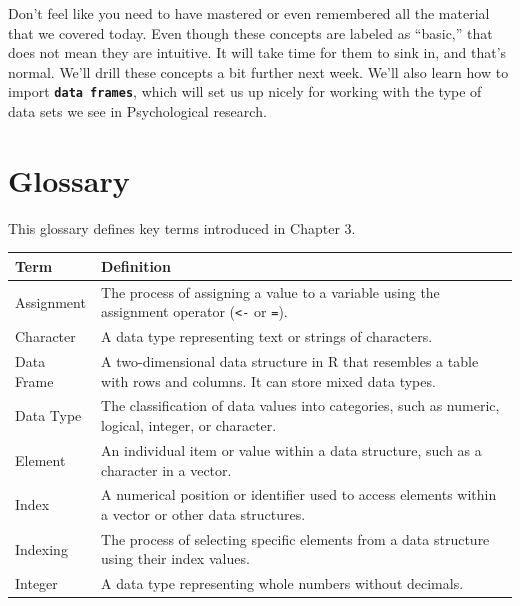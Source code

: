 \documentclass[
]{book}
\begin{document}
Don't feel like you need to have mastered or even remembered all the material that we covered today. Even though these concepts are labeled as ``basic,'' that does not mean they are intuitive. It will take time for them to sink in, and that's normal. We'll drill these concepts a bit further next week. We'll also learn how to import \textbf{\texttt{data\ frames}}, which will set us up nicely for working with the type of data sets we see in Psychological research.

\section{Glossary}\label{glossary-1}

This glossary defines key terms introduced in Chapter 3.

\begin{longtable}[]{@{}
  >{\raggedright\arraybackslash}p{}
  >{\raggedright\arraybackslash}p{}@{}}
\toprule\noalign{}
\begin{minipage}[b]{\linewidth}\raggedright
Term
\end{minipage} & \begin{minipage}[b]{\linewidth}\raggedright
Definition
\end{minipage} \\
\midrule\noalign{}
\endhead
\bottomrule\noalign{}
\endlastfoot
Assignment & The process of assigning a value to a variable using the assignment operator (\texttt{\textless{}-} or \texttt{=}). \\
Character & A data type representing text or strings of characters. \\
Data Frame & A two-dimensional data structure in R that resembles a table with rows and columns. It can store mixed data types. \\
Data Type & The classification of data values into categories, such as numeric, logical, integer, or character. \\
Element & An individual item or value within a data structure, such as a character in a vector. \\
Index & A numerical position or identifier used to access elements within a vector or other data structures. \\
Indexing & The process of selecting specific elements from a data structure using their index values. \\
Integer & A data type representing whole numbers without decimals. \\

\end{longtable}
\end{document}
